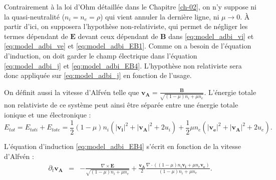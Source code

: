 Contrairement à la loi d'Ohm détaillée dans le Chapitre \ref{ch-02}, on n'y suppose ni la quasi-neutralité ($n_i = n_e = \rho$) qui vient annuler la dernière ligne, ni $\mu \rightarrow 0$. À partir d'ici, on supposera l'hypothèse non-relativiste, qui permet de négliger les termes dépendant de $\boldsymbol{E}$ devant ceux dépendant de $\boldsymbol{B}$ dans \eqref{eq:model_adbi_vi} et \eqref{eq:model_adbi_ve} et \eqref{eq:model_adbi_EB1}. Comme on a besoin de l'équation d'induction, on doit garder le champ électrique dans l'équation \eqref{eq:model_adbi_j} et  \eqref{eq:model_adbi_EB4}. L'hypothèse non relativiste sera donc appliquée sur \eqref{eq:model_adbi_j} en fonction de l'usage.

On définit aussi la vitesse d'Alfvén telle que $\boldsymbol{v_A} = \frac{\boldsymbol{B}}{\sqrt{(1-\mu) n_i + \mu n_e}}$. L'énergie totale non relativiste de ce système peut ainsi être séparée entre une énergie totale ionique et une électronique : 
\begin{equation*}
E_{tot} = E_{toti} + E_{tote} =  \frac{1}{2} (1-\mu) n_i (|\boldsymbol{v_i}|^2 + |\boldsymbol{v_A}|^2 + 2 u_i) + \frac{1}{2} \mu n_e (|\boldsymbol{v_e}|^2 + |\boldsymbol{v_A}|^2 + 2 u_e).
\end{equation*}

L'équation d'induction \eqref{eq:model_adbi_EB4} s'écrit en fonction de la vitesse d'Alfvén : 
\begin{eqnarray}
\label{eq:model_adbi_B}  \partial_t \boldsymbol{v_A} &=& - \frac{\nabla \times  \boldsymbol{E}}{\sqrt{(1-\mu) n_i + \mu n_e}} + \frac{\boldsymbol{v_{A}}}{2}\frac{\nabla \cdot ((1-\mu) n_i \boldsymbol{v_i}+\mu n_e \boldsymbol{v_e})}{(1-\mu) n_i + \mu n_e}  .
\end{eqnarray}



